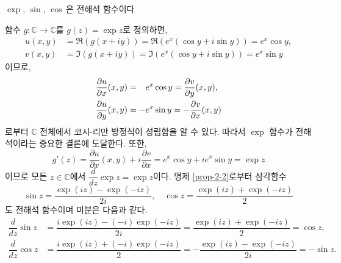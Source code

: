 \begin{saltexample}[label=example-2-8]{$\exp$, $\sin$, $\cos$\,은 전해석 함수이다}{}

함수 $g:\mathbb C \to \mathbb C$를 $g(z) = \exp z$로 정의하면,
\begin{align*}
u(x,y) &= \Re(g(x+iy)) = \Re(e^x(\cos y + i\sin y)) = e^x \cos y,\\
v(x,y) &= \Im(g(x+iy)) = \Im(e^x(\cos y + i\sin y)) = e^x \sin y
\end{align*}
이므로, 
\begin{align*}
\dfrac{\partial u}{\partial x}(x,y) &= \hphantom{-}e^x\cos y 
= \dfrac{\partial v}{\partial y}(x,y), \\
\dfrac{\partial u}{\partial y}(x,y) & =-e^x\sin y 
= - \dfrac{\partial v}{\partial x}(x,y)
\end{align*}
로부터 $\mathbb C$ 전체에서 코시-리만 방정식이 성립함을 알 수 있다.
따라서 $\exp$ 함수가 전해석이라는 중요한 결론에 도달한다.
또한, 
\[
g'(z) = \dfrac{\partial u}{\partial x}(x,y) + i\dfrac{\partial v}{\partial x}
= e^x\cos y + i e^x\sin y = \exp z
\]
이므로 모든 $z\in\mathbb C$에서 $\dfrac{d}{dz}\exp z = \exp z$이다.
명제 \ref{prop-2-2}로부터 삼각함수
\[
\sin z  = \dfrac{\exp(iz) - \exp(-iz)}{2i}, \quad
\cos z = \dfrac{\exp(iz) + \exp(-iz)}2
\]
도 전해석 함수이며 미분은 다음과 같다.
\begin{align*}
\dfrac{d}{dz} \sin z &= \dfrac{i\exp(iz) - (-i)\exp(-iz)}{2i}
= \dfrac{\exp(iz) + \exp(-iz)}2 = \cos z, \\
\dfrac{d}{dz} \cos z &= \dfrac{i\exp(iz)+(-i)\exp(-iz)}2
= - \dfrac{\exp(iz) - \exp(-iz)}{2i} = - \sin z.
\end{align*}
\end{saltexample}


